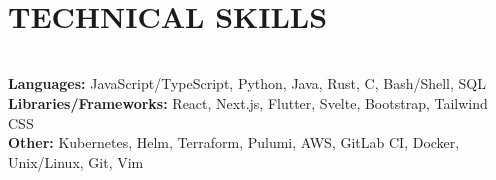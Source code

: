 \documentclass[12pt,letterpaper,roman]{moderncv}
\makeatletter
\def \scaleFont {1.09} %
\def \headingSpace {-9mm * \real{\scaleFont}} %
\def \skillSpacing {1mm} %
\def \scaleHeadings {1.15}
\newcommand*{\customcvproject}[4][.25em]{
  \begin{tabular}{@{}l}
    {\relscale{\scaleHeadings}\bfseries #2}
  \end{tabular}
  \hfill%
  \begin{tabular}{l@{}}
     {\textcolor{blue}{#3}}
  \end{tabular}\\[-5.5mm]
  \ifx&#4&
  \else{\\
    \begin{minipage}{\maincolumnwidth}
      \small#4
    \end{minipage}}\fi
  \par\addvspace{#1}\leavevmode \\[0mm]}
\makeatother
\begin{document}
\leavevmode\\[-20mm]
\section{TECHNICAL SKILLS} \leavevmode \\[\headingSpace]
\textbf{Languages:}
JavaScript/TypeScript,\hspace*{\skillSpacing}
Python,\hspace*{\skillSpacing}
Java,\hspace*{\skillSpacing}
Rust,\hspace*{\skillSpacing}
C,\hspace*{\skillSpacing}
Bash/Shell,\hspace*{\skillSpacing}
SQL\hspace*{\skillSpacing}
\\
\textbf{Libraries/Frameworks:}
React,\hspace*{\skillSpacing}
Next.js,\hspace*{\skillSpacing}
Flutter,\hspace*{\skillSpacing}
Svelte,\hspace*{\skillSpacing}
Bootstrap,\hspace*{\skillSpacing}
Tailwind CSS\hspace*{\skillSpacing}
\\
\textbf{Other:}
Kubernetes,\hspace*{\skillSpacing}
Helm,\hspace*{\skillSpacing}
Terraform,\hspace*{\skillSpacing}
Pulumi,\hspace*{\skillSpacing}
AWS,\hspace*{\skillSpacing}
GitLab CI,\hspace*{\skillSpacing}
Docker,\hspace*{\skillSpacing}
Unix/Linux,\hspace*{\skillSpacing}
Git,\hspace*{\skillSpacing}
Vim\hspace*{\skillSpacing}
\end{document}
